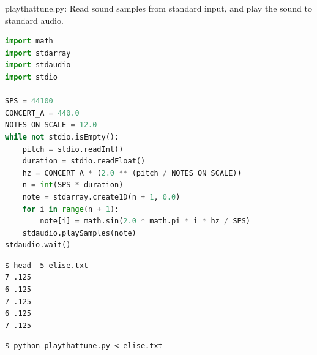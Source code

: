 \documentclass[8pt,a4paper,compress]{beamer}
\begin{document}
\begin{frame}[fragile]
\pause

\begin{framed}
\tiny playthattune.py: Read sound samples from standard input, and play the sound to standard audio.
\end{framed}

\begin{lstlisting}[language=Python]
import math
import stdarray
import stdaudio
import stdio

SPS = 44100
CONCERT_A = 440.0
NOTES_ON_SCALE = 12.0
while not stdio.isEmpty():
    pitch = stdio.readInt()
    duration = stdio.readFloat()
    hz = CONCERT_A * (2.0 ** (pitch / NOTES_ON_SCALE))
    n = int(SPS * duration)
    note = stdarray.create1D(n + 1, 0.0)
    for i in range(n + 1):
        note[i] = math.sin(2.0 * math.pi * i * hz / SPS)
    stdaudio.playSamples(note)
stdaudio.wait()
\end{lstlisting}

\pause

\begin{minipage}{150pt}
\begin{lstlisting}[language={}]
$ head -5 elise.txt
7 .125 
6 .125 
7 .125 
6 .125 
7 .125 
\end{lstlisting}

\pause

\begin{lstlisting}[language={}]
$ python playthattune.py < elise.txt
\end{lstlisting}
\end{minipage}%
\begin{minipage}{150pt}
\hfill {}
\end{minipage}
\end{frame}
\end{document}
